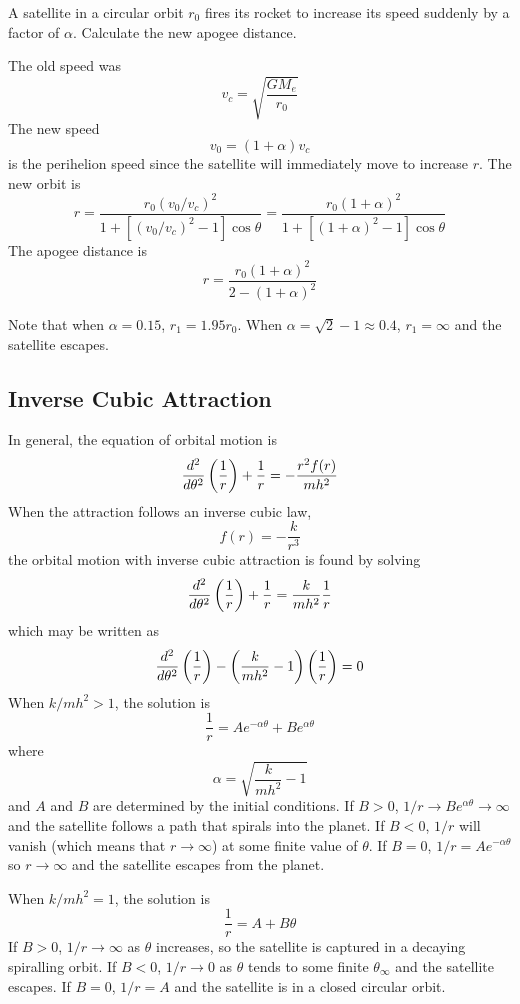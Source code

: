 \begin{example}
\problem
A satellite in a circular orbit $r_0$ fires its rocket to increase its speed
suddenly by a factor of $\alpha$.   Calculate the new apogee distance.

\solution
The old speed was
$$v_c=\sqrt{\frac{GM_e}{r_0}}$$
The new speed 
$$v_0=(1+\alpha)v_c$$
is the perihelion speed since the satellite will immediately move to
increase $r$.  The new orbit is
$$r=\frac{r_0\left(v_0/v_c\right)^2}
{1+\left[\left(v_0/v_c\right)^2-1\right]\cos\theta}
=\frac{r_0(1+\alpha)^2}{1+\left[(1+\alpha)^2-1\right]\cos\theta}$$
The apogee distance is
$$r=\frac{r_0(1+\alpha)^2}{2-(1+\alpha)^2}$$

Note that when $\alpha=0.15$, $r_1=1.95 r_0$.  When
$\alpha=\sqrt{2}-1\approx 0.4$, $r_1=\infty$ and the satellite escapes.
\end{example}

\subsection{Inverse Cubic Attraction}


In general, the equation of orbital motion is
$$\frac{d^{2}}{d{\theta}^{2}}\left(\frac{1}{r}\right)+\frac{1}{r}=-\frac{r^2f(r)}{mh^2}$$
When the attraction follows an inverse cubic law, 
$$f(r)=-\frac{k}{r^3}$$
the orbital motion with inverse cubic attraction is found by solving
$$\frac{d^{2}}{d{\theta}^{2}}\left(\frac{1}{r}\right)+\frac{1}{r}
=\frac{k}{mh^2}\frac{1}{r}$$
which may be written as
$$\frac{d^{2}}{d{\theta}^{2}}\left(\frac{1}{r}\right)
-\left(\frac{k}{mh^2}-1\right)\left(\frac{1}{r}\right)=0$$
When $k/mh^2>1$, the solution is
$$\frac{1}{r}=Ae^{-\alpha\theta}+Be^{\alpha\theta}$$
where 
$$\alpha=\sqrt{\frac{k}{mh^2}-1}$$
and $A$ and $B$ are determined by the initial conditions.
If $B>0$, $1/r\to Be^{\alpha\theta}\to\infty$ and the satellite
follows a path that spirals into the planet.
If $B<0$, $1/r$ will vanish (which means that $r\to\infty$) at some
finite value of $\theta$.
If $B=0$, $1/r=Ae^{-\alpha\theta}$ so $r\to\infty$ and the satellite
escapes from the planet.

When $k/mh^2=1$, the solution is
$$\frac{1}{r}=A+B\theta$$
If $B>0$, $1/r\to\infty$ as $\theta$ increases, so the satellite is
captured in a decaying spiralling orbit.
If $B<0$, $1/r\to 0$ as $\theta$ tends to some finite
$\theta_{\infty}$ and the satellite escapes.  If $B=0$, $1/r=A$ and
the satellite is in a closed circular orbit.

